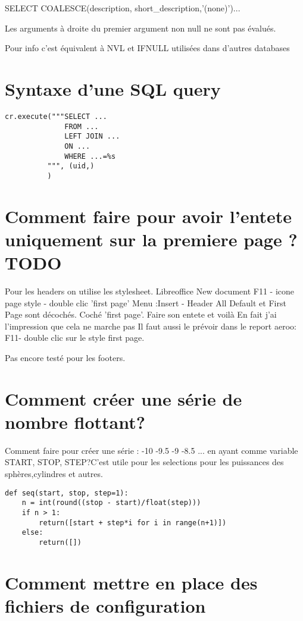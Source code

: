 \documentclass[12pt,a4paper]{article}
\begin{document}
SELECT COALESCE(description, short\_description,'(none)')...

Les arguments à droite du premier argument non null ne sont pas évalués.

Pour info c'est équivalent à NVL et IFNULL utilisées dans d'autres databases

\section{Syntaxe d'une SQL query}
\label{sec:sqlquery}

\begin{verbatim}
cr.execute("""SELECT ...
              FROM ...
              LEFT JOIN ...
              ON ...
              WHERE ...=%s
          """, (uid,)
          )
\end{verbatim}


\section{Comment faire pour avoir l'entete uniquement sur la premiere page ?TODO}
\label{sec:first_page_header}

Pour les headers on utilise les stylesheet.
Libreoffice New document F11 - icone page style - double clic 'first page'
Menu :Insert - Header  All Default et First  Page sont décochés. Coché 'first page'.
Faire son entete et voilà
En fait j'ai l'impression que cela ne marche pas
Il faut aussi le prévoir dans le report aeroo: F11- double clic sur le style first page.

Pas encore testé pour les footers.


\section{Comment créer une série de nombre flottant?}
\label{sec:serie}

Comment faire pour créer une série : -10 -9.5 -9 -8.5 ... en ayant comme variable START, STOP, STEP?C'est utile pour les selections pour les puissances des sphères,cylindres et autres.  
\begin{verbatim}
def seq(start, stop, step=1):
    n = int(round((stop - start)/float(step)))
    if n > 1:
        return([start + step*i for i in range(n+1)])
    else:
        return([])
\end{verbatim}

\section{Comment mettre en place des fichiers de configuration}
\label{sec:configfile}
\end{document}
